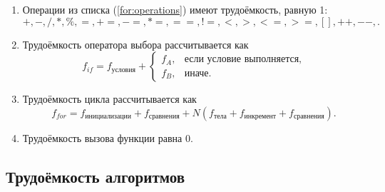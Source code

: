 \begin{enumerate}[label=\arabic*)]
	\item Операции из списка (\ref{for:operations}) имеют трудоёмкость, равную 1:
	\begin{equation}
		\label{for:operations}
		+, -, /, *, \%, =, +=, -=, *=, ==, !=, <, >, <=, >=, [], ++, {-}-, . 
	\end{equation}
	\item Трудоёмкость оператора выбора  рассчитывается как
	\begin{equation}
		\label{for:if}
		f_{if} = f_{\text{условия}} +
		\begin{cases}
			f_A, & \text{если условие выполняется,}\\
			f_B, & \text{иначе.}
		\end{cases}
	\end{equation}
	\item Трудоёмкость цикла рассчитывается как
	\begin{equation}
		\label{for:cycle}
		f_{for} = f_{\text{инициализации}} + f_{\text{сравнения}} + N(f_{\text{тела}} + f_{\text{инкремент}} + f_{\text{сравнения}}).
	\end{equation}
	\item Трудоёмкость вызова функции равна 0.
\end{enumerate}


\subsection{Трудоёмкость алгоритмов}



\pagebreak